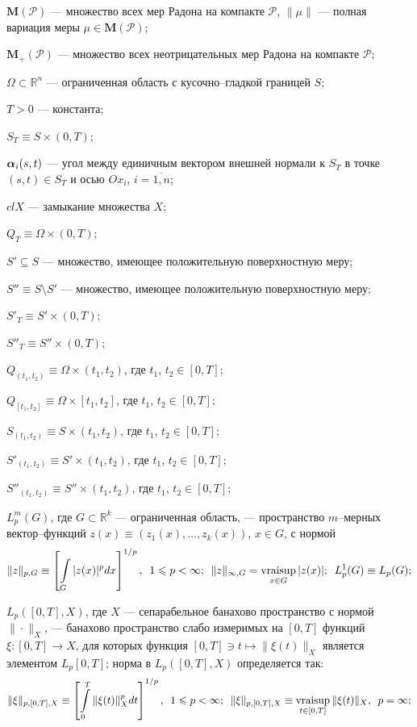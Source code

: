 \documentclass{report}
\newcommand{\vraisup}{\mathop{\rm vraisup}}
\newcommand{\myalpha}{\text{\mathversion{bold}$\alpha$\mathversion{normal}}}
\begin{document}
$\mathbf{M}(\mathcal{P})$ --- множество всех мер Радона на компакте $\mathcal{P}$, $\|\mu\|$ --- полная вариация меры
$\mu\in \mathbf{M}(\mathcal{P})$;

$\mathbf{M}_+(\mathcal{P})$ --- множество всех неотрицательных мер Радона на компакте $\mathcal{P}$;

$\Omega\subset \mathbb{R}^n$ --- ограниченная область с кусочно--гладкой границей $S$;

$T>0$ --- константа;

$S_T\equiv S\times(0,T)$;

${\myalpha}_i(s,t)$ --- угол между единичным вектором внешней нормали к $S_T$ в точке $(s,t)\in S_T$ и осью $Ox_i$, $i=\overline{1,n}$;

$cl X$ --- замыкание множества $X$;

$Q_T\equiv\Omega\times(0,T)$;

$S'\subseteq S$ --- множество, имеющее положительную поверхностную меру;

$S''\equiv S\setminus S'$ --- множество, имеющее положительную поверхностную меру;

$S'_T\equiv S'\times(0,T)$;

$S''_T\equiv S''\times(0,T)$;

$Q_{(t_1,t_2)} \equiv\Omega\times(t_1,t_2)$, где $t_1$, $t_2\in[0,T]$;

$Q_{[t_1,t_2]} \equiv\Omega\times[t_1,t_2]$, где $t_1$, $t_2\in[0,T]$;

$S_{(t_1,t_2)}\equiv S\times(t_1,t_2)$, где $t_1$, $t_2\in[0,T]$;

$S'_{(t_1,t_2)}\equiv S'\times(t_1,t_2)$, где $t_1$, $t_2\in[0,T]$;

$S''_{(t_1,t_2)}\equiv S''\times(t_1,t_2)$, где $t_1$, $t_2\in[0,T]$;

$L_p^m(G)$, где $G\subset \mathbb{R}^k$  --- ограниченная область, --- пространство $m$--мерных вектор--функций $z(x)\equiv(z_1(x),\dots,z_k(x))$, $x\in G$, с нормой
\begin{gather*}
\|z\|_{p,G}\equiv\left[\int\limits_G|z(x)|^pdx\right]^{1/p},\,\,\,1\leqslant p<\infty;\,\,\,
\|z\|_{\infty,G}=\vraisup\limits_{x\in G}|z(x)|;\,\,\, L^1_p(G)\equiv L_p(G);
\end{gather*}

$L_p([0,T],X)$, где $X$ --- сепарабельное банахово пространство с нормой $\|\cdot\|_X$, --- банахово пространство слабо измеримых на $[0,T]$ функций $\xi\colon[0,T]\to X$, для которых
функция $[0,T]\ni t\mapsto\|\xi(t)\|_X$ является элементом $L_p[0,T]$; норма в $L_p([0,T],X)$ определяется так:
\begin{gather*}
\|\xi\|_{p,[0,T],X}\equiv\left[\int\limits_0^T\|\xi(t)\|_X^pdt\right]^{1/p},\,\,\,1\leqslant p<\infty;\,\,\,
    \|\xi\|_{p,[0,T],X}\equiv\vraisup\limits_{t\in[0,T]}\|\xi(t)\|_X,\,\,\,p=\infty;
\end{gather*}
\end{document}
